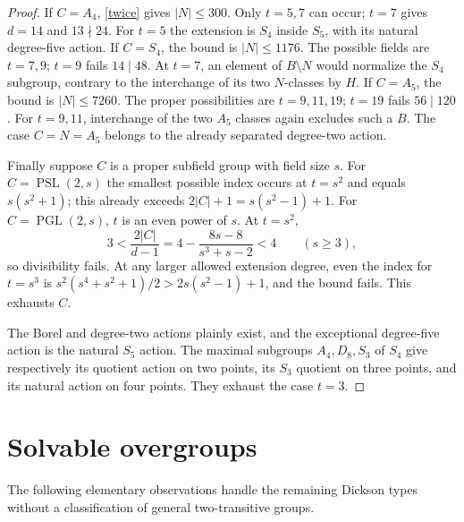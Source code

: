 \documentclass[11pt]{article}
\newcommand{\PSL}{\operatorname{PSL}}
\newcommand{\PGL}{\operatorname{PGL}}
\begin{document}
\begin{proof}
If $C=A_4$, \eqref{twice} gives $|N|\leq300$. Only
$t=5,7$ can occur; $t=7$ gives $d=14$ and $13\nmid24$.
For $t=5$ the extension is $S_4$ inside $S_5$, with its natural
degree-five action. If $C=S_4$, the bound is $|N|\leq1176$.
The possible fields are $t=7,9$; $t=9$ fails $14\mid48$.
At $t=7$, an element of $B\setminus N$ would normalize the
$S_4$ subgroup, contrary to the interchange of its two $N$-classes
by $H$. If $C=A_5$, the bound is $|N|\leq7260$.
The proper possibilities are $t=9,11,19$; $t=19$ fails
$56\mid120$. For $t=9,11$, interchange of the two $A_5$
classes again excludes such a $B$. The case $C=N=A_5$
belongs to the already separated degree-two action.

Finally suppose $C$ is a proper subfield group with field size
$s$. For $C=\PSL(2,s)$ the smallest possible index occurs
at $t=s^2$ and equals $s(s^2+1)$; this already exceeds
$2|C|+1=s(s^2-1)+1$. For $C=\PGL(2,s)$, $t$ is an
even power of $s$. At $t=s^2$,
\[
 3<\frac{2|C|}{d-1}
   =4-\frac{8s-8}{s^3+s-2}<4 \qquad(s\geq3),
\]
so divisibility fails. At any larger allowed extension degree,
even the index for $t=s^3$ is
$s^2(s^4+s^2+1)/2>2s(s^2-1)+1$, and the bound fails.
This exhausts $C$.

The Borel and degree-two actions plainly exist, and the exceptional
degree-five action is the natural $S_5$ action. The maximal
subgroups $A_4,D_8,S_3$ of $S_4$ give respectively its quotient
action on two points, its $S_3$ quotient on three points, and its
natural action on four points. They exhaust the case $t=3$.
\end{proof}

\section{Solvable overgroups}
The following elementary observations handle the remaining Dickson
types without a classification of general two-transitive groups.
\end{document}

